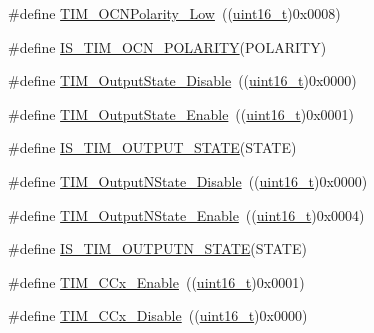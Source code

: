 \begin{DoxyCompactItemize}
\item 
\#define \hyperlink{group___t_i_m___output___compare___n___polarity_ga9582560b2e7dae2e8dc3b65909b0c9cf}{T\+I\+M\+\_\+\+O\+C\+N\+Polarity\+\_\+\+Low}~((\hyperlink{_p_e___types_8h_a1f1825b69244eb3ad2c7165ddc99c956}{uint16\+\_\+t})0x0008)
\item 
\#define \hyperlink{group___t_i_m___output___compare___n___polarity_gad7385dee1d2b6ce0daf23ceaac4439cd}{I\+S\+\_\+\+T\+I\+M\+\_\+\+O\+C\+N\+\_\+\+P\+O\+L\+A\+R\+I\+TY}(P\+O\+L\+A\+R\+I\+TY)
\item 
\#define \hyperlink{group___t_i_m___output___compare__state_ga4ad0f484cfa16b5190654da8278940d0}{T\+I\+M\+\_\+\+Output\+State\+\_\+\+Disable}~((\hyperlink{_p_e___types_8h_a1f1825b69244eb3ad2c7165ddc99c956}{uint16\+\_\+t})0x0000)
\item 
\#define \hyperlink{group___t_i_m___output___compare__state_ga65afdda8761b6ac5ed0c0ad67c05dffe}{T\+I\+M\+\_\+\+Output\+State\+\_\+\+Enable}~((\hyperlink{_p_e___types_8h_a1f1825b69244eb3ad2c7165ddc99c956}{uint16\+\_\+t})0x0001)
\item 
\#define \hyperlink{group___t_i_m___output___compare__state_ga5848617f830d2de688eaff50ed279679}{I\+S\+\_\+\+T\+I\+M\+\_\+\+O\+U\+T\+P\+U\+T\+\_\+\+S\+T\+A\+TE}(S\+T\+A\+TE)
\item 
\#define \hyperlink{group___t_i_m___output___compare___n__state_gade8506a50fd6ba58273e9da81f6b0b54}{T\+I\+M\+\_\+\+Output\+N\+State\+\_\+\+Disable}~((\hyperlink{_p_e___types_8h_a1f1825b69244eb3ad2c7165ddc99c956}{uint16\+\_\+t})0x0000)
\item 
\#define \hyperlink{group___t_i_m___output___compare___n__state_gac4c08f9d66ce138c6978668020526c6f}{T\+I\+M\+\_\+\+Output\+N\+State\+\_\+\+Enable}~((\hyperlink{_p_e___types_8h_a1f1825b69244eb3ad2c7165ddc99c956}{uint16\+\_\+t})0x0004)
\item 
\#define \hyperlink{group___t_i_m___output___compare___n__state_ga81e27a982d9707f699451f30314c4274}{I\+S\+\_\+\+T\+I\+M\+\_\+\+O\+U\+T\+P\+U\+T\+N\+\_\+\+S\+T\+A\+TE}(S\+T\+A\+TE)
\item 
\#define \hyperlink{group___t_i_m___capture___compare__state_ga6acaeb60dad50ce9799ae9f62ed7719a}{T\+I\+M\+\_\+\+C\+Cx\+\_\+\+Enable}~((\hyperlink{_p_e___types_8h_a1f1825b69244eb3ad2c7165ddc99c956}{uint16\+\_\+t})0x0001)
\item 
\#define \hyperlink{group___t_i_m___capture___compare__state_gaa1441f66393b9daa9f97efb29b364cd3}{T\+I\+M\+\_\+\+C\+Cx\+\_\+\+Disable}~((\hyperlink{_p_e___types_8h_a1f1825b69244eb3ad2c7165ddc99c956}{uint16\+\_\+t})0x0000)

\end{DoxyCompactItemize}
